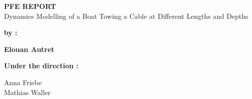 \begingroup
\thispagestyle{empty}
\begin{center}
\vspace*{1cm}
{\LARGE \textsc{\textbf{PFE REPORT}}}\\
\vspace*{2cm}
{\Large Dynamics Modelling of a Boat Towing a Cable at Different Lengths and Depths}\par %
\end{center}
\vspace*{2cm}

\textbf{by :} 

\begin{center}
{
\Large
\textbf{Elouan Autret}\\
}
\end{center}

\vspace*{1cm}

{\textbf{Under the direction :}}\\
\begin{center}
{\Large
Anna Friebe\\
Mathias Waller\\
}


\end{center}
\endgroup



